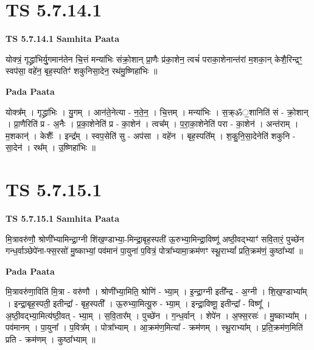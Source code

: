 \documentclass[17pt]{extarticle}
\begin{document}
\section*{ TS 5.7.14.1 }

\textbf{TS 5.7.14.1 } \newline
\textbf{Samhita Paata} \newline

योक्त्रं॒ गृद्ध्रा॑भिर्यु॒गमान॑तेन चि॒त्तं मन्या॑भिः संक्रो॒शान् प्रा॒णैः प्र॑का॒शेन॒ त्वचं॑ पराका॒शेनान्त॑रां म॒शका॒न् केशै॒रिन्द्रꣳ॒॒ स्वप॑सा॒ वहे॑न॒ बृह॒स्पतिꣳ॑ शकुनिसा॒देन॒ रथ॑मु॒ष्णिहा॑भिः ॥ \newline

\textbf{Pada Paata} \newline

योक्त्र᳚म् । गृद्ध्रा॑भिः । यु॒गम् । आन॑ते॒नेत्या - न॒ते॒न॒ । चि॒त्तम् । मन्या॑भिः । स॒क्र्ॐ॒शानिति॑ सं - क्रो॒शान् । प्रा॒णैरिति॑ प्र - अ॒नैः । प्र॒का॒शेनेति॑ प्र - का॒शेन॑ । त्वच᳚म् । प॒रा॒का॒शेनेति॑ परा - का॒शेन॑ । अन्त॑राम् । म॒शकान्॑ । केशैः᳚ । इन्द्र᳚म् । स्वप॒सेति॑ सु - अप॑सा । वहे॑न । बृह॒स्पति᳚म् । श॒कु॒नि॒सा॒देनेति॑ शकुनि - सा॒देन॑ । रथ᳚म् । उ॒ष्णिहा॑भिः ॥  \newline




\section*{ TS 5.7.15.1 }

\textbf{TS 5.7.15.1 } \newline
\textbf{Samhita Paata} \newline

मि॒त्रावरु॑णौ॒ श्रोणी᳚भ्यामिन्द्रा॒ग्नी शि॑ख॒ण्डाभ्या॒-मिन्द्रा॒बृह॒स्पती॑ ऊ॒रुभ्या॒मिन्द्रा॒विष्णू॑ अष्ठी॒वद्भ्याꣳ॑ सवि॒तारं॒ पुच्छे॑न गन्ध॒र्वाञ्छेपे॑ना-फ्स॒रसो॑ मु॒ष्काभ्यां॒ पव॑मानं पा॒युना॑ प॒वित्रं॒ पोत्रा᳚भ्यामा॒क्रम॑णꣳ स्थू॒राभ्यां᳚ प्रति॒क्रम॑णं॒ कुष्ठा᳚भ्यां ॥ \newline

\textbf{Pada Paata} \newline

मि॒त्रावरु॑णा॒विति॑ मि॒त्रा - वरु॑णौ । श्रोणी᳚भ्या॒मिति॒ श्रोणि॑ - भ्या॒म् । इ॒न्द्रा॒ग्नी इती᳚न्द्र - अ॒ग्नी । शि॒ख॒ण्डाभ्या᳚म् । इन्द्रा॒बृह॒स्पती॒ इतीन्द्रा᳚ - बृह॒स्पती᳚ । ऊ॒रुभ्या॒मित्यू॒रु - भ्या॒म् । इन्द्रा॒विष्णू॒ इतीन्द्रा᳚ - विष्णू᳚ । अ॒ष्ठी॒वद्भ्या॒मित्य॑ष्ठी॒वत् - भ्या॒म् । स॒वि॒तार᳚म् । पुच्छे॑न । ग॒न्ध॒र्वान् । शेपे॑न । अ॒फ्स॒रसः॑ । मु॒ष्काभ्या᳚म् । पव॑मानम् । पा॒युना᳚ । प॒वित्र᳚म् । पोत्रा᳚भ्याम् । आ॒क्रम॑ण॒मित्या᳚ - क्रम॑णम् । स्थू॒राभ्या᳚म् । प्र॒ति॒क्रम॑ण॒मिति॑ प्रति - क्रम॑णम् । कुष्ठा᳚भ्याम् ॥  \newline
\end{document}
